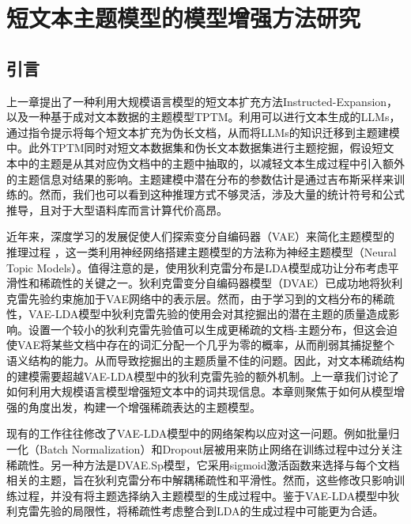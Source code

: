 \chapter{短文本主题模型的模型增强方法研究}\label{chap:sparentm}
\section{引言}
上一章提出了一种利用大规模语言模型的短文本扩充方法Instructed-Expansion，以及一种基于成对文本数据的主题模型TPTM。利用可以进行文本生成的LLMs，通过指令提示将每个短文本扩充为伪长文档，从而将LLMs的知识迁移到主题建模中。此外TPTM同时对短文本数据集和伪长文本数据集进行主题挖掘，假设短文本中的主题是从其对应伪文档中的主题中抽取的，以减轻文本生成过程中引入额外的主题信息对结果的影响。主题建模中潜在分布的参数估计是通过吉布斯采样来训练的。然而，我们也可以看到这种推理方式不够灵活，涉及大量的统计符号和公式推导，且对于大型语料库而言计算代价高昂。

近年来，深度学习的发展促使人们探索变分自编码器（VAE）\cite{VAE}来简化主题模型的推理过程 \cite{NVDM,AVITM}，这一类利用神经网络搭建主题模型的方法称为神经主题模型\cite{NTMsurvey}（Neural Topic Models）。值得注意的是，使用狄利克雷分布是LDA模型成功让分布考虑平滑性和稀疏性的关键之一\cite{ZhaoPHJ}。狄利克雷变分自编码器模型（DVAE）\cite{DVAE}已成功地将狄利克雷先验约束施加于VAE网络中的表示层。然而，由于学习到的文档分布的稀疏性，VAE-LDA模型中狄利克雷先验的使用会对其挖掘出的潜在主题的质量造成影响\cite{overallQuality}。设置一个较小的狄利克雷先验值可以生成更稀疏的文档-主题分布，但这会迫使VAE将某些文档中存在的词汇分配一个几乎为零的概率，从而削弱其捕捉整个语义结构的能力\cite{DVAE,AVITM}。从而导致挖掘出的主题质量不佳的问题。因此，对文本稀疏结构的建模需要超越VAE-LDA模型中的狄利克雷先验的额外机制。上一章我们讨论了如何利用大规模语言模型增强短文本中的词共现信息。本章则聚焦于如何从模型增强的角度出发，构建一个增强稀疏表达的主题模型。

现有的工作往往修改了VAE-LDA模型中的网络架构以应对这一问题。例如批量归一化（Batch Normalization）和Dropout层被用来防止网络在训练过程中过分关注稀疏性\cite{Pachinko}。另一种方法是DVAE.Sp模型\cite{DVAE}，它采用sigmoid激活函数来选择与每个文档相关的主题，旨在狄利克雷分布中解耦稀疏性和平滑性。然而，这些修改只影响训练过程，并没有将主题选择纳入主题模型的生成过程中。鉴于VAE-LDA模型中狄利克雷先验的局限性，将稀疏性考虑整合到LDA的生成过程中可能更为合适。

